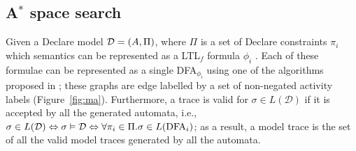 \subsection{A$^*$ space search}
Given a Declare model $\mathcal{D}=(A,\Pi)$, where $\Pi$ is a set of Declare constraints $\pi_i$ which semantics can be represented as a LTL$_f$ formula $\phi_i$ \cite{GiacomoMM14}. Each of these formulae can be represented as a single DFA$_{\phi_i}$ \cite{LeoniMA12}  using one of the algorithms proposed in \cite{DBLP:conf/bpm/Westergaard11}; these graphs are edge labelled by a set of non-negated activity labels (Figure~\ref{fig:ma}). Furthermore, a trace is valid for $\sigma\in L(\mathcal{D})$ if it is accepted by all the generated automata, i.e., $\sigma\in L(\mathcal{D})\Leftrightarrow\sigma\vDash\mathcal{D}\Leftrightarrow \forall \pi_i\in\Pi. \sigma\in L(\textup{DFA}_i) $; as a result, a model trace is the set of all the valid model traces generated by all the automata.

